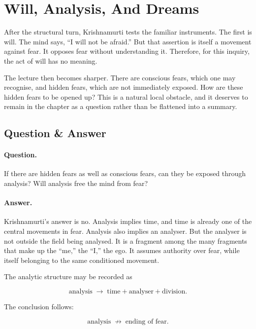 \section{Will, Analysis, And Dreams}

After the structural turn, Krishnamurti tests the familiar instruments. The first is will. The mind says, ``I will not be afraid.'' But that assertion is itself a movement against fear. It opposes fear without understanding it. Therefore, for this inquiry, the act of will has no meaning.

The lecture then becomes sharper. There are conscious fears, which one may recognise, and hidden fears, which are not immediately exposed. How are these hidden fears to be opened up? This is a natural local obstacle, and it deserves to remain in the chapter as a question rather than be flattened into a summary.

\subsection{Question \& Answer}

\paragraph{Question.} If there are hidden fears as well as conscious fears, can they be exposed through analysis? Will analysis free the mind from fear?

\paragraph{Answer.} Krishnamurti's answer is no. Analysis implies time, and time is already one of the central movements in fear. Analysis also implies an analyser. But the analyser is not outside the field being analysed. It is a fragment among the many fragments that make up the ``me,'' the ``I,'' the ego. It assumes authority over fear, while itself belonging to the same conditioned movement.

The analytic structure may be recorded as

\begin{equation}
\text{analysis}
\;\longrightarrow\;
\text{time} + \text{analyser} + \text{division}.
\end{equation}

The conclusion follows:

\begin{equation}
\text{analysis}
\;\not\longrightarrow\;
\text{ending of fear}.
\end{equation}

